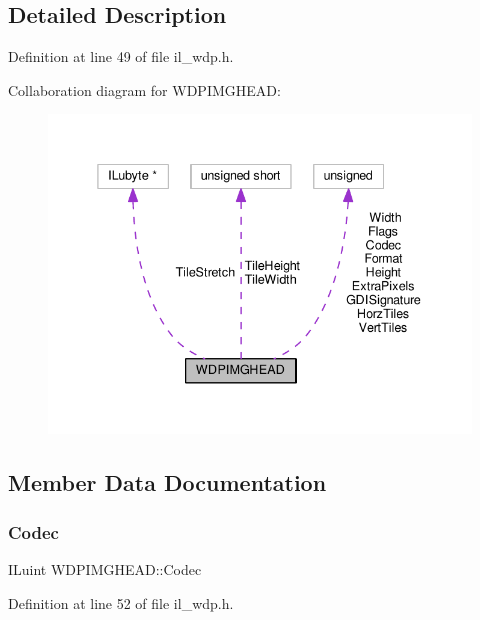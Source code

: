 \subsection{Detailed Description}


Definition at line 49 of file il\+\_\+wdp.\+h.



Collaboration diagram for W\+D\+P\+I\+M\+G\+H\+E\+AD\+:
\nopagebreak
\begin{figure}[H]
\begin{center}
\leavevmode
\includegraphics[width=338pt]{df/d45/structWDPIMGHEAD__coll__graph}
\end{center}
\end{figure}


\subsection{Member Data Documentation}
\mbox{\label{structWDPIMGHEAD_a97dabfc0751c26b58cfa01864f40d097}} 
\subsubsection{\texorpdfstring{Codec}{Codec}}
{\footnotesize\ttfamily I\+Luint W\+D\+P\+I\+M\+G\+H\+E\+A\+D\+::\+Codec}



Definition at line 52 of file il\+\_\+wdp.\+h.

\mbox{\label{structWDPIMGHEAD_a19a80cf82e37f06a21232b37de806094}} 
